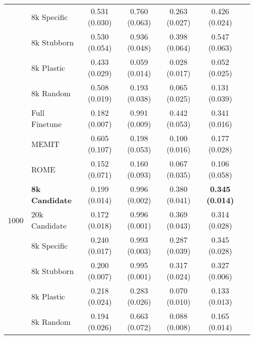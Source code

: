 \begin{table}[h]
{\begin{tabular}{clccccc}
 & 8k Specific                 & 0.531 (0.030) & 0.760 (0.063) & 0.263 (0.027) & 0.426 (0.024) \\
 & 8k Stubborn                 & 0.530 (0.054) & 0.936 (0.048) & 0.398 (0.064) & 0.547 (0.063) \\
 & 8k Plastic                  & 0.433 (0.029) & 0.059 (0.014) & 0.028 (0.017) & 0.052 (0.025) \\
 & 8k Random                   & 0.508 (0.019) & 0.193 (0.038) & 0.065 (0.025) & 0.131 (0.039) \\
\midrule
\multirow{11}{*}{1000} 
 & Full Finetune                & 0.182 (0.007) & 0.991 (0.009) & 0.442 (0.053) & 0.341 (0.016) \\
 & MEMIT\citep{Meng2022a}                       & 0.605 (0.107) & 0.198 (0.053) & 0.100 (0.016) & 0.177 (0.028) \\
 & ROME\citep{Meng2022}                         & 0.152 (0.071) & 0.160 (0.093) & 0.067 (0.035) & 0.106 (0.058) \\
\cmidrule(lr){2-6}
 & \textbf{8k Candidate}        & 0.199 (0.014) & 0.996 (0.002) & 0.380 (0.041) & \textbf{0.345 (0.014)} \\
 & 20k Candidate               & 0.172 (0.018) & 0.996 (0.001) & 0.369 (0.043) & 0.314 (0.028)  \\
 & 8k Specific                 & 0.240 (0.017) & 0.993 (0.003) & 0.287 (0.039) & 0.345 (0.028) \\
 & 8k Stubborn                 & 0.200 (0.007) & 0.995 (0.001) & 0.317 (0.024) & 0.327 (0.006) \\
 & 8k Plastic                  & 0.218 (0.024) & 0.283 (0.026) & 0.070 (0.010) & 0.133 (0.013) \\
 & 8k Random                   & 0.194 (0.026) & 0.663 (0.072) & 0.088 (0.008) & 0.165 (0.014) \\
\bottomrule
\end{tabular}
}
\end{table}
